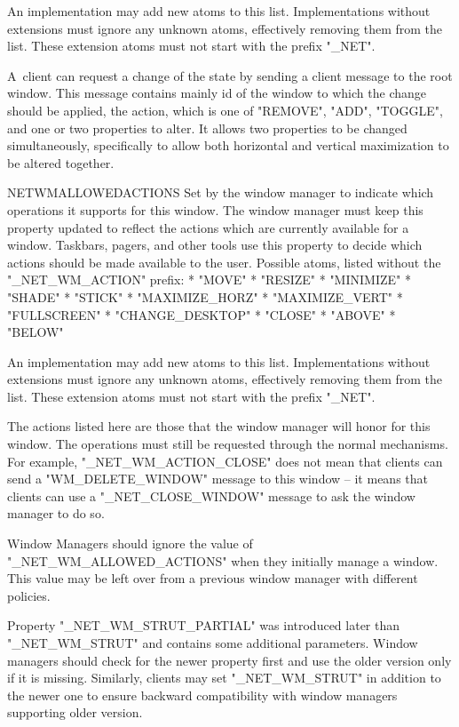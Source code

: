 An implementation may add new atoms to this list.
Implementations without extensions must ignore any unknown atoms, effectively removing them from the list.
These extension atoms must not start with the prefix "_NET".

A~client can request a change of the state by sending a client message to the root window.
This message contains mainly id of the window to which the change should be applied,
the action, which is one of "REMOVE", "ADD", "TOGGLE", and one or two properties to alter.
It allows two properties to be changed simultaneously, specifically to allow both horizontal and
vertical maximization to be altered together.

\heading \uns NET\uns WM\uns ALLOWED\uns ACTIONS
Set by the window manager to indicate which operations it supports for this window.
The window manager must keep this property updated to reflect the actions which are currently available for a window.
Taskbars, pagers, and other tools use this property to decide which actions should be made available to the user.
Possible atoms, listed without the "_NET_WM_ACTION" prefix:
\begitems
* "MOVE"
* "RESIZE"
* "MINIMIZE"
* "SHADE"
* "STICK"
* "MAXIMIZE_HORZ"
* "MAXIMIZE_VERT"
* "FULLSCREEN"
* "CHANGE_DESKTOP"
* "CLOSE"
* "ABOVE"
* "BELOW"
\enditems

An implementation may add new atoms to this list.
Implementations without extensions must ignore any unknown atoms, effectively removing them from the list.
These extension atoms must not start with the prefix "_NET".

The actions listed here are those that the window manager will honor for this window.
The operations must still be requested through the normal mechanisms.
For example, "_NET_WM_ACTION_CLOSE" does not mean that clients can send a "WM_DELETE_WINDOW" message to this window -- it means that clients can
use a "_NET_CLOSE_WINDOW" message to ask the window manager to do so.

Window Managers should ignore the value of "_NET_WM_ALLOWED_ACTIONS" when they initially manage a window.
This value may be left over from a previous window manager with different policies.

Property "_NET_WM_STRUT_PARTIAL" was introduced later than "_NET_WM_STRUT" and contains some additional parameters.
Window managers should check for the newer property first and use the older version only if it is missing.
Similarly, clients may set "_NET_WM_STRUT" in addition to the newer one to ensure backward compatibility with
window managers supporting older version.

